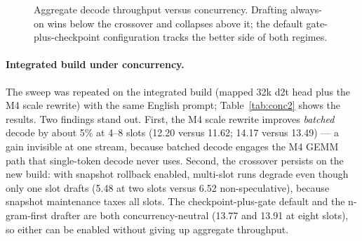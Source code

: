 \documentclass[10pt,twocolumn]{article}
\begin{document}
\begin{figure}[t]
\centering
{}
\caption{Aggregate decode throughput versus concurrency. Drafting always-on wins below the crossover and collapses above it; the default gate-plus-checkpoint configuration tracks the better side of both regimes.}
\label{fig:conc}
\end{figure}

\paragraph{Integrated build under concurrency.}
The sweep was repeated on the integrated build (mapped 32k d2t head plus the M4 scale rewrite) with the same English prompt; Table~\ref{tab:conc2} shows the results. Two findings stand out. First, the M4 scale rewrite improves \emph{batched} decode by about 5\% at 4--8 slots (12.20 versus 11.62; 14.17 versus 13.49) --- a gain invisible at one stream, because batched decode engages the M4 GEMM path that single-token decode never uses. Second, the crossover persists on the new build: with snapshot rollback enabled, multi-slot runs degrade even though only one slot drafts (5.48 at two slots versus 6.52 non-speculative), because snapshot maintenance taxes all slots. The checkpoint-plus-gate default and the n-gram-first drafter are both concurrency-neutral (13.77 and 13.91 at eight slots), so either can be enabled without giving up aggregate throughput.
\end{document}
